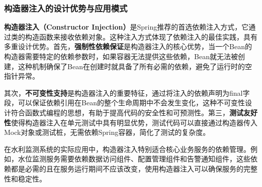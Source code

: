 \subsubsection{构造器注入的设计优势与应用模式}\label{ux6784ux9020ux5668ux6ce8ux5165ux7684ux8bbeux8ba1ux4f18ux52bfux4e0eux5e94ux7528ux6a21ux5f0f}

\textbf{构造器注入（Constructor Injection）}是Spring推荐的首选依赖注入方式，它通过类的构造函数来接收依赖对象。这种注入方式体现了依赖注入的最佳实践，具有多重设计优势。首先，\textbf{强制性依赖保证}是构造器注入的核心优势，当一个Bean的构造器需要特定的依赖参数时，如果容器无法提供这些依赖，Bean就无法被创建，这种机制确保了Bean在创建时就具备了所有必需的依赖，避免了运行时的空指针异常。

其次，\textbf{不可变性支持}是构造器注入的重要特征，通过将注入的依赖声明为final字段，可以保证依赖引用在Bean的整个生命周期中不会发生变化，这种不可变性设计符合函数式编程的思想，有助于提高代码的安全性和可预测性。第三，\textbf{测试友好性}使得构造器注入在单元测试中具有明显优势，测试代码可以直接通过构造器传入Mock对象或测试桩，无需依赖Spring容器，简化了测试的复杂度。

在水利监测系统的实际应用中，构造器注入特别适合核心业务服务的依赖管理。例如，水位监测服务需要依赖数据访问组件、配置管理组件和告警通知组件，这些依赖都是必需的且在服务运行期间不应该改变，使用构造器注入可以确保服务的完整性和稳定性。

